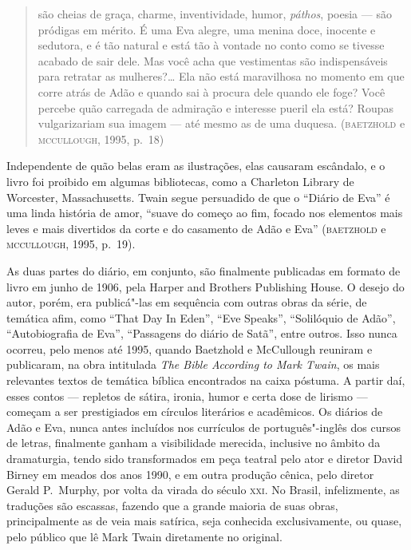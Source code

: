 \begin{quote}
são cheias de graça, charme, inventividade, humor, \textit{páthos}, poesia --- 
são pródigas em mérito. É uma Eva alegre, uma menina doce, inocente e
sedutora, e é tão natural e está tão à vontade no conto como se tivesse acabado de sair dele.
Mas você acha que vestimentas são indispensáveis
para retratar as mulheres?\ldots{} Ela não está maravilhosa no momento em
que corre atrás de Adão e quando sai à procura dele quando ele foge?
Você percebe quão carregada de admiração e interesse pueril ela está?
Roupas vulgarizariam sua imagem --- até mesmo as de uma duquesa.
(\textsc{baetzhold} e \textsc{mccullough}, 1995, p.~18)
\end{quote}

Independente de quão belas eram as ilustrações, elas causaram escândalo, e o
livro foi proibido em algumas bibliotecas, como a Charleton Library de
Worcester, Massachusetts. Twain segue persuadido de que o ``Diário de Eva'' é
uma linda história de amor, ``suave do começo ao fim,
focado nos elementos mais leves e mais divertidos da corte e do
casamento de Adão e Eva'' (\textsc{baetzhold} e \textsc{mccullough}, 1995, p.~19).

As duas partes do diário, em conjunto, são finalmente
publicadas em formato de livro em junho de 1906, pela Harper and Brothers Publishing House. O
desejo do autor, porém, era publicá"-las em sequência com outras obras
da série, de temática afim, como ``That Day In Eden'',
``Eve Speaks'', ``Solilóquio de Adão'',
``Autobiografia de Eva”, “Passagens do diário de Satã'', entre outros.
Isso nunca ocorreu, pelo menos até 1995, quando Baetzhold e McCullough
reuniram e publicaram, na obra intitulada \textit{The Bible According to Mark
Twain}, os mais relevantes textos de temática bíblica encontrados na caixa
póstuma. A partir daí, esses contos --- repletos de sátira, ironia, humor e
certa dose de lirismo --- começam a ser prestigiados em círculos
literários e acadêmicos. Os diários de Adão e Eva, nunca antes incluídos nos
currículos de português"-inglês dos cursos de letras, finalmente ganham a
visibilidade merecida, inclusive no âmbito da dramaturgia, tendo sido
transformados em peça teatral pelo ator e diretor David Birney em meados
dos anos 1990, e em outra produção cênica, pelo diretor Gerald P.~Murphy, 
por volta da virada do século \textsc{xxi}. No Brasil, infelizmente, 
as traduções são escassas, fazendo que a grande maioria de suas obras, 
principalmente as de veia mais satírica, seja conhecida exclusivamente, ou quase,
pelo público que lê Mark Twain diretamente no original. 

